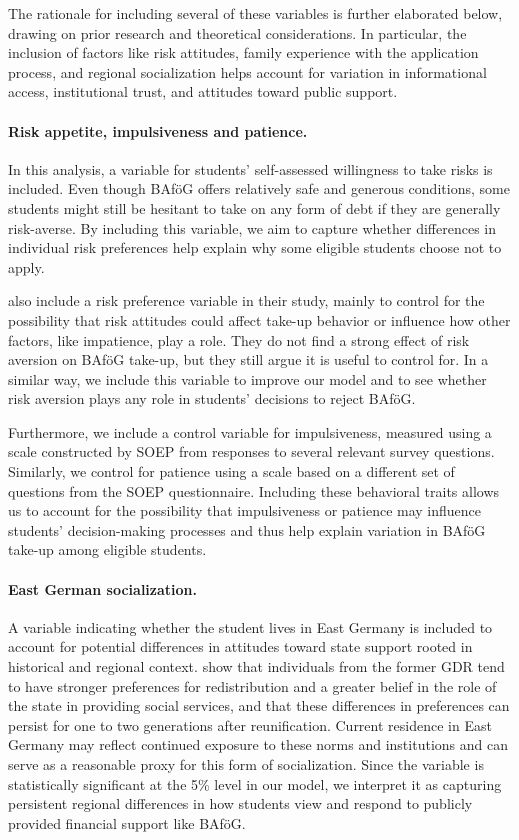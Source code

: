 The rationale for including several of these variables is further elaborated below, drawing on prior research and theoretical considerations. In particular, the inclusion of factors like risk attitudes, family experience with the application process, and regional socialization helps account for variation in informational access, institutional trust, and attitudes toward public support.

\paragraph{Risk appetite, impulsiveness and patience.} In this analysis, a variable for students' self-assessed willingness to take risks is included. 
Even though BAföG offers relatively safe and generous conditions, some students might still be hesitant to take on any form of debt if they are generally risk-averse. 
By including this variable, we aim to capture whether differences in individual risk preferences help explain why some eligible students choose not to apply.

\cite{herber_non-take-up_2019} also include a risk preference variable in their study, mainly to control for the possibility that risk attitudes could affect take-up behavior or influence how other factors, like impatience, play a role. 
They do not find a strong effect of risk aversion on BAföG take-up, but they still argue it is useful to control for. 
In a similar way, we include this variable to improve our model and to see whether risk aversion plays any role in students’ decisions to reject BAföG.

Furthermore, we include a control variable for impulsiveness, measured using a scale constructed by SOEP from responses to several relevant survey questions.
Similarly, we control for patience using a scale based on a different set of questions from the SOEP questionnaire.
Including these behavioral traits allows us to account for the possibility that impulsiveness or patience may influence students’ decision-making processes and thus help explain variation in BAföG take-up among eligible students.

\paragraph{East German socialization.}  A variable indicating whether the student lives in East Germany is included to account for potential differences in attitudes toward state support rooted in historical and regional context. \cite{alesina_good-bye_2007} show that individuals from the former GDR tend to have stronger preferences for redistribution and a greater belief in the role of the state in providing social services, and that these differences in preferences can persist for one to two generations after reunification. Current residence in East Germany may reflect continued exposure to these norms and institutions and can serve as a reasonable proxy for this form of socialization. Since the variable is statistically significant at the 5\% level in our model, we interpret it as capturing persistent regional differences in how students view and respond to publicly provided financial support like BAföG.

